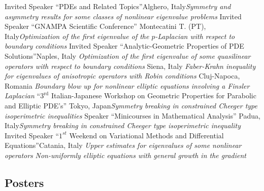 \documentclass[11pt,a4paper,sans,colorlinks,linkcolor=green]{moderncv}
\begin{document}
 {Invited Speaker} {``PDEs and Related Topics''}{Alghero, Italy}{}{\footnotesize\textit{Symmetry and asymmetry results for some classes of nonlinear eigenvalue problems}}
 {Invited Speaker} {``GNAMPA Scientific Conference''} {Montecatini T. (PT), Italy}{}{\footnotesize\textit{Optimization of the first eigenvalue of the $p$-Laplacian with respect to boundary conditions}}
 {Invited Speaker} {``Analytic-Geometric Properties of PDE Solutions''}{Naples, Italy} {}{\footnotesize\textit{Optimization of the first eigenvalue of some quasilinear operators with respect to boundary conditions}}
 {Siena, Italy} {} {\footnotesize\textit{Faber-Krahn inequality for eigenvalues of anisotropic operators with Robin conditions}}
 {Cluj-Napoca, Romania}{} {\footnotesize\textit{Boundary blow up for nonlinear elliptic equations involving a Finsler Laplacian}}
 {``$3^{\textrm{rd}}$ Italian-Japanese Workshop on Geometric Properties for Parabolic and Elliptic PDE's''} {Tokyo, Japan}{}{\footnotesize\textit{Symmetry breaking in constrained Cheeger type isoperimetric inequalities}}
 {Speaker} {``Minicourses in Mathematical Analysis''} {Padua, Italy}{}{\footnotesize\textit{Symmetry breaking in constrained Cheeger type isoperimetric    inequality}}
 {Invited Speaker} {``$1^{st}$ Weekend on Variational Methods and Differential Equations''}{Catania, Italy}{}  {\footnotesize\textit{Upper estimates for eigenvalues of some nonlinear operators}}
 {\footnotesize\textit{Non-uniformly elliptic equations with general growth in the gradient}}

\subsection{Posters}
\end{document}
